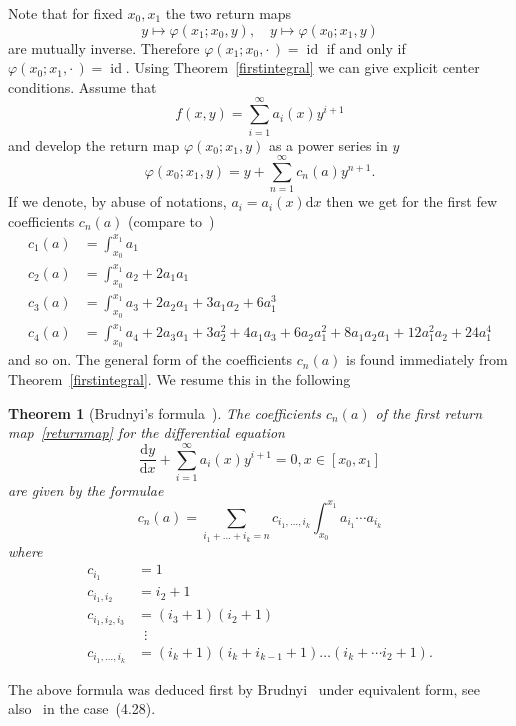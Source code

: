 \documentclass[11pt]{article}
\newtheorem{theo}{Theorem}[section]
\theoremstyle{definition}
\numberwithin{equation}{section}
\numberwithin{figure}{section}
\numberwithin{table}{section}
\newcommand*{\dd}{\mathrm{d}}
\newcommand*{\dx}{\dd x}
\newcommand*{\dy}{\dd y}
\DeclareMathOperator{\id}{id}
\begin{document}
Note that for fixed $x_0,x_1$ the two return maps
\[
y \mapsto \varphi(x_1;x_0,y), \quad y \mapsto \varphi(x_0;x_1,y)
\]
are mutually inverse. Therefore $\varphi(x_1;x_0,{\cdot\,}) = \id$ if and only if $ \varphi(x_0;x_1,{\cdot\,}) = \id$. Using Theorem~\ref{firstintegral} we can give explicit center conditions. Assume that
\[
f(x,y) = \sum_{i=1}^\infty a_i(x) y^{i+1}
\]
and develop the return map $ \varphi(x_0;x_1,y) $ as a power series in $y$
\begin{equation}\label{returnmap}
\varphi(x_0;x_1,y) = y + \sum_{n=1}^\infty c_n(a) y^{n+1}.
\end{equation}
If we denote, by abuse of notations, $a_{i}= a_{i}(x) \dx $ then we get for the first few coefficients $c_n(a)$ (compare to~\cite[p.~450]{bry10})
\begin{align*}
c_1(a) & = \int_{x_0}^{x_1} a_1 \\
c_2(a) & = \int_{x_0}^{x_1} a_2 + 2 a_1a_1\\
c_3(a) & = \int_{x_0}^{x_1} a_3 + 2 a_2 a_1 + 3 a_1a_2 + 6 a_1^3 \\
c_4(a) & = \int_{x_0}^{x_1} a_4 + 2 a_3 a_1 + 3 a_2^2 + 4 a_1a_3 + 6a_2a_1^2 + 8 a_1a_2a_1 + 12 a_1^2a_2 + 24 a_1^4
\end{align*}
and so on. The general form of the coefficients $c_n(a)$ is found immediately from Theorem~\ref{firstintegral}. We resume this in the following



\begin{theo}[Brudnyi's formula~\cite{brud06}]\label{brf}
The coefficients $c_n(a)$ of the first return map~\eqref{returnmap} for the differential equation
\[
\frac{\dy}{\dx} + \sum_{i=1}^\infty a_i(x) y^{i+1} = 0, x\in [x_0,x_1]
\]
are given by the formulae
\[
c_n(a) = \sum_{i_1+\dots + i_k=n} c_{i_1,\dots,i_k} \int_{x_0}^{x_1} a_{i_1} \cdots a_{i_k}
\]
where
\begin{align*}
c_{i_1} & = 1\\
c_{i_1,i_2} & = i_2+1 \\
c_{i_1,i_2,i_3} & = (i_3+1)(i_2+1)\\
& \;\:\vdots \\
c_{i_1,\dots,i_k} & = (i_k+1)(i_k+i_{k-1} +1) \dots (i_k + \cdots i_2 +1).
\end{align*}
\end{theo}

The above formula was deduced first by Brudnyi~\cite[p.~422]{brud06} under equivalent form, see also~\cite[Proposition~2.4]{bry10} in the case~(4.28).
\end{document}
